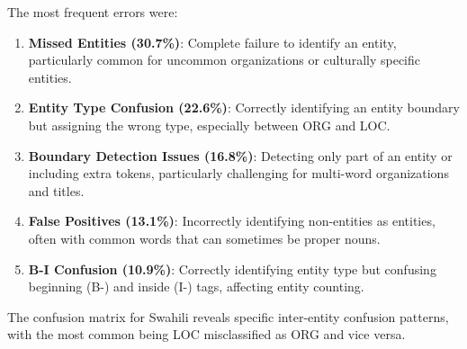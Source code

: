 \documentclass[
]{article}
\begin{document}
The most frequent errors were:

\begin{enumerate}
\def\labelenumi{\arabic{enumi}.}
\item
  \textbf{Missed Entities (30.7\%)}: Complete failure to identify an
  entity, particularly common for uncommon organizations or culturally
  specific entities.
\item
  \textbf{Entity Type Confusion (22.6\%)}: Correctly identifying an
  entity boundary but assigning the wrong type, especially between ORG
  and LOC.
\item
  \textbf{Boundary Detection Issues (16.8\%)}: Detecting only part of an
  entity or including extra tokens, particularly challenging for
  multi-word organizations and titles.
\item
  \textbf{False Positives (13.1\%)}: Incorrectly identifying
  non-entities as entities, often with common words that can sometimes
  be proper nouns.
\item
  \textbf{B-I Confusion (10.9\%)}: Correctly identifying entity type but
  confusing beginning (B-) and inside (I-) tags, affecting entity
  counting.
\end{enumerate}

The confusion matrix for Swahili reveals specific inter-entity confusion
patterns, with the most common being LOC misclassified as ORG and vice
versa.
\end{document}
